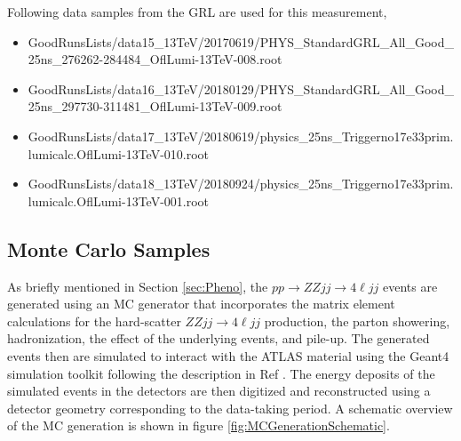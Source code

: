 Following data samples from the GRL are used for this measurement,
\begin{itemize}
\footnotesize
\item{ { GoodRunsLists/data15\_13TeV/20170619/PHYS\_StandardGRL\_All\_Good\_25ns\_276262-284484\_OflLumi-13TeV-008.root}}
\item{  {GoodRunsLists/data16\_13TeV/20180129/PHYS\_StandardGRL\_All\_Good\_25ns\_297730-311481\_OflLumi-13TeV-009.root}}
\item{{ GoodRunsLists/data17\_13TeV/20180619/physics\_25ns\_Triggerno17e33prim.lumicalc.OflLumi-13TeV-010.root}}
\item{{GoodRunsLists/data18\_13TeV/20180924/physics\_25ns\_Triggerno17e33prim.lumicalc.OflLumi-13TeV-001.root}}
\end{itemize}

\normalsize

\subsection{Monte Carlo Samples }
\label{subsec:MCSamples}

As briefly mentioned in Section \ref{sec:Pheno}, the $pp \rightarrow ZZjj\rightarrow 4\ell jj$ events are generated using an MC generator that incorporates the matrix element calculations for the hard-scatter $ZZjj\rightarrow 4\ell jj$ production, the parton showering, hadronization, the effect of the underlying events, and pile-up. The generated events then are simulated to interact with the ATLAS material using the Geant4 simulation toolkit following the description in Ref \cite{GEANT4}. The energy deposits of the simulated events in the detectors are then digitized and reconstructed using a detector geometry corresponding to the data-taking period. A schematic overview of the MC generation is shown in figure \ref{fig:MCGenerationSchematic}.

